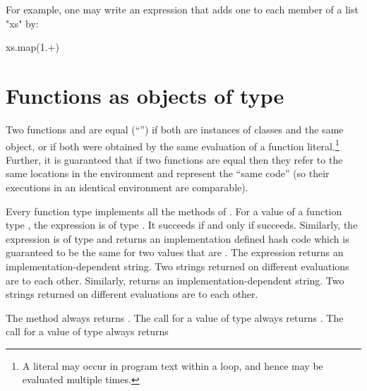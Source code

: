 For example,
one may write an expression that adds one to each member of a
list \xcd"xs" by:

\begin{xten}
xs.map(1.+)
\end{xten}

\section{Functions as objects of type }
\label{FunctionAnyMethods}

\label{FunctionEquality}
Two functions  and  are equal (``\Xcd{==}'') if both are
instances of classes and the same object, or if both were obtained by
the same evaluation of a function literal.\footnote{A literal may
  occur in program text within a loop, and hence may be evaluated
  multiple times.} Further, it is guaranteed that if two functions are
equal then they refer to the same locations in the environment and
represent the ``same code'' (so their executions in an identical
environment are comparable).


Every function type implements all the methods of .
For a value  of a function type , 
the expression  is of type .
It succeeds if and only if  succeeds. Similarly, the 
expression  is of type  and returns
an implementation defined hash code which is guaranteed to be the
same for two values that are . The expression
 returns an implementation-dependent string.
Two strings returned on different evaluations are  to each other. 
Similarly,   returns an implementation-dependent string.
Two strings returned on different evaluations are  to each other. 

The method  always returns . The call
 for  a value of type  always returns
. The call 
 for  a value of type  always returns

